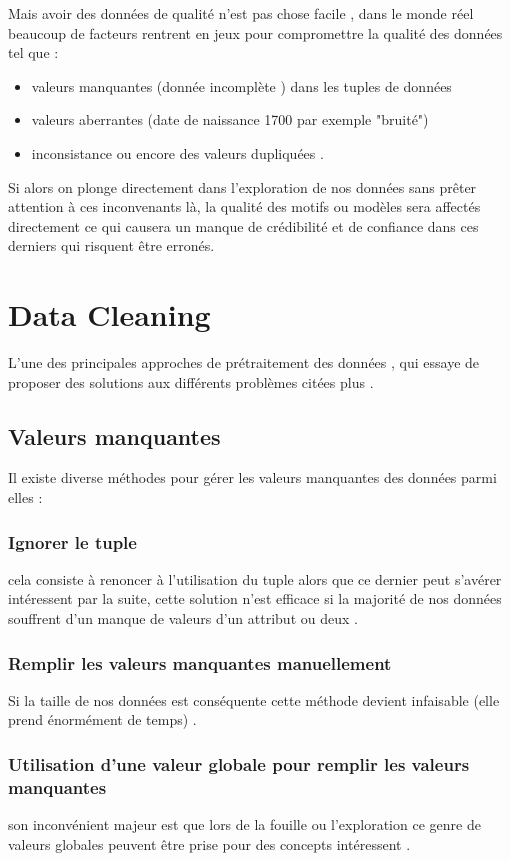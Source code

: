 \documentclass[12pt,a4paper,oneside]{book}
\begin{document}
     Mais avoir des données de qualité n'est pas chose facile , dans le monde réel beaucoup de facteurs rentrent en jeux pour compromettre  la qualité des données tel que :
     \begin{itemize}
        \item  valeurs manquantes (donnée incomplète ) dans les tuples de données 
         \item  valeurs aberrantes (date de naissance 1700 par exemple "bruité") 
        \item inconsistance ou encore des valeurs dupliquées . 
       
     \end{itemize} 
    
    Si alors on plonge  directement dans l'exploration de nos données sans prêter attention à ces inconvenants là, la qualité des motifs ou modèles  sera affectés directement  ce qui causera un manque de crédibilité et de confiance dans ces derniers qui risquent être erronés.
    
    \section{Data Cleaning}
    L'une des principales approches de prétraitement des données , qui essaye de proposer des solutions aux différents problèmes citées plus .
    
    \subsection{Valeurs manquantes}
    Il existe diverse méthodes pour gérer les valeurs manquantes des données parmi elles :
    \subsubsection{Ignorer le tuple}
    cela consiste à renoncer à l'utilisation du tuple alors que ce dernier peut s'avérer intéressent par la suite, cette solution n'est efficace si la majorité de nos données souffrent d'un manque de valeurs d'un attribut ou deux .
    \subsubsection{Remplir les valeurs manquantes manuellement}
    Si la taille de nos données est conséquente cette méthode devient infaisable (elle prend énormément de temps) .
    \subsubsection{Utilisation d'une valeur globale pour remplir les valeurs manquantes}
    son inconvénient majeur est que lors de la fouille ou l'exploration ce genre de  valeurs globales peuvent être prise pour des concepts intéressent .
\end{document}

